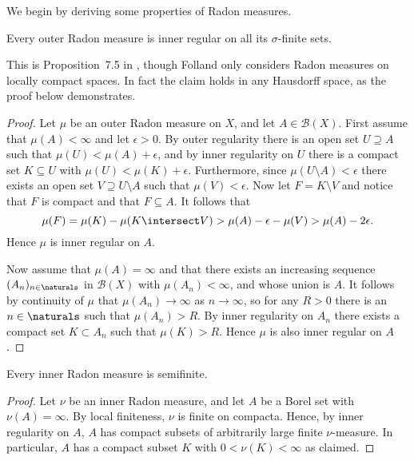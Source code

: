 \documentclass[article, a4paper, 11pt, oneside]{memoir}
\numberwithin{equation}{chapter}
\newcommand{\calB}{\mathcal{B}}
\newcommand{\borel}[1]{\calB(#1)}
\begin{document}
We begin by deriving some properties of Radon measures.


\begin{proposition}
    \label{thm:outer-Radon-inner-regular-on-finites}
    Every outer Radon measure is inner regular on all its $\sigma$-finite sets.
\end{proposition}
%
This is Proposition~7.5 in \textcite{folland2007}, though Folland only considers Radon measures on locally compact spaces. In fact the claim holds in any Hausdorff space, as the proof below demonstrates.

\begin{proof}
    Let $\mu$ be an outer Radon measure on $X$, and let $A \in \borel{X}$. First assume that $\mu(A) < \infty$ and let $\epsilon > 0$. By outer regularity there is an open set $U \supseteq A$ such that $\mu(U) < \mu(A) + \epsilon$, and by inner regularity on $U$ there is a compact set $K \subseteq U$ with $\mu(U) < \mu(K) + \epsilon$. Furthermore, since $\mu(U \setminus A) < \epsilon$ there exists an open set $V \supseteq U \setminus A$ such that $\mu(V) < \epsilon$. Now let $F = K \setminus V$ and notice that $F$ is compact and that $F \subseteq A$. It follows that
    \begin{equation*}
        \mu(F)
            = \mu(K) - \mu(K \intersect V)
            > \mu(A) - \epsilon - \mu(V)
            > \mu(A) - 2\epsilon.
    \end{equation*}
    Hence $\mu$ is inner regular on $A$.

    Now assume that $\mu(A) = \infty$ and that there exists an increasing sequence $(A_n)_{n \in \naturals}$ in $\borel{X}$ with $\mu(A_n) < \infty$, and whose union is $A$. It follows by continuity of $\mu$ that $\mu(A_n) \to \infty$ as $n \to \infty$, so for any $R > 0$ there is an $n \in \naturals$ such that $\mu(A_n) > R$. By inner regularity on $A_n$ there exists a compact set $K \subset A_n$ such that $\mu(K) > R$. Hence $\mu$ is also inner regular on $A$.
\end{proof}


\begin{proposition}
    \label{prop:inner-Radon-semifinite}
    Every inner Radon measure is semifinite.
\end{proposition}

\begin{proof}
    Let $\nu$ be an inner Radon measure, and let $A$ be a Borel set with $\nu(A) = \infty$. By local finiteness, $\nu$ is finite on compacta. Hence, by inner regularity on $A$, $A$ has compact subsets of arbitrarily large finite $\nu$-measure. In particular, $A$ has a compact subset $K$ with $0 < \nu(K) < \infty$ as claimed.
\end{proof}
\end{document}
